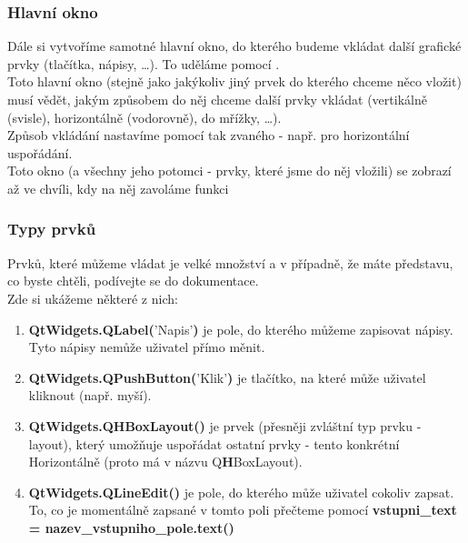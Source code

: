 \subsubsection{Hlavní okno}
Dále si vytvoříme samotné hlavní okno, do kterého budeme vkládat další grafické prvky (tlačítka, nápisy, \dots). To uděláme pomocí .\\
Toto hlavní okno (stejně jako jakýkoliv jiný prvek do kterého chceme něco vložit) musí vědět, jakým způsobem do něj chceme další prvky vkládat (vertikálně (svisle), horizontálně (vodorovně), do mřížky, \dots).\\
Způsob vkládání nastavíme pomocí tak zvaného  - např.  pro horizontální uspořádání.\\
Toto okno (a všechny jeho potomci - prvky, které jsme do něj vložili) se zobrazí až ve chvíli, kdy na něj zavoláme funkci 
\subsubsection{Typy prvků}
Prvků, které můžeme vládat je velké množství a v případně, že máte představu, co byste chtěli, podívejte se do dokumentace.\\
Zde si ukážeme některé z nich:
\begin{enumerate}
\item[] \textbf{QtWidgets.QLabel(}'Napis'\textbf{)} je pole, do kterého můžeme zapisovat nápisy. Tyto nápisy nemůže uživatel přímo měnit.
\item[] \textbf{QtWidgets.QPushButton(}'Klik'\textbf{)} je tlačítko, na které může uživatel kliknout (např. myší).
\item[] \textbf{QtWidgets.QHBoxLayout()} je prvek (přesněji zvláštní typ prvku - layout), který umožňuje uspořádat ostatní prvky - tento konkrétní Horizontálně (proto má v názvu Q\textbf{H}BoxLayout).
\item[] \textbf{QtWidgets.QLineEdit()} je pole, do kterého může uživatel cokoliv zapsat. To, co je momentálně zapsané v tomto poli přečteme pomocí \textbf{vstupni\_text = nazev\_vstupniho\_pole.text()}
\end{enumerate}

